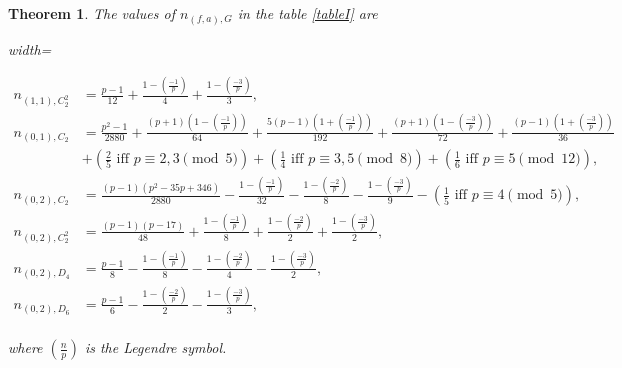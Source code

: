 \documentclass{amsart}
\numberwithin{equation}{section}
\newtheorem{theorem}{Theorem}[section]  %
\theoremstyle{definition}
\theoremstyle{remark}
\begin{document}
\begin{theorem}
The values of $n_{(f,a),G}$ in the table \ref{tableI} are\\
\begin{adjustbox}{width=\textwidth}
\begin{minipage}{1.1\textwidth}
\begin{align*}
n_{(1,1),C_2^2}&=\frac{p-1}{12}+\frac{1-\left(\frac{-1}{p}\right)}{4}+\frac{1-\left(\frac{-3}{p}\right)}{3},\\
n_{(0,1),C_2}&= \frac{p^2 - 1}{2880} 
+ \frac{(p+1)\left( 1 - \left( \frac{-1}{p} \right) \right)}{64}
+ \frac{5(p - 1)\left( 1 + \left( \frac{-1}{p} \right) \right)}{192}
+ \frac{(p + 1)\left( 1 - \left( \frac{-3}{p} \right) \right)}{72}
+ \frac{(p - 1)\left( 1 + \left( \frac{-3}{p} \right) \right)}{36}\\
&+ \left(\frac{2}{5} \text { iff } p \equiv 2, 3\pmod{5}\right)+\left(\frac{1}{4} \text { iff } p \equiv 3, 5\pmod{8}\right)+\left(\frac{1}{6} \text { iff } p \equiv 5\pmod{12}\right),\\
n_{(0,2),C_2}&=\frac{(p-1)\left(p^2-35 p+346\right)}{2880}-\frac{1-\left(\frac{-1}{p}\right)}{32}-\frac{1-\left(\frac{-2}{p}\right)}{8}-\frac{1-\left(\frac{-3}{p}\right)}{9}-\left(\frac{1}{5} \text { iff } p \equiv 4 \pmod 5\right),\\
n_{(0,2),C_2^2}&=\frac{(p-1)(p-17)}{48}+\frac{1-\left(\frac{-1}{p}\right)}{8}+\frac{1-\left(\frac{-2}{p}\right)}{2}+\frac{1-\left(\frac{-3}{p}\right)}{2},\\
n_{(0,2),D_4}&=\frac{p-1}{8}-\frac{1-\left(\frac{-1}{p}\right)}{8}-\frac{1-\left(\frac{-2}{p}\right)}{4}-\frac{1-\left(\frac{-3}{p}\right)}{2},\\
n_{(0,2),D_6}&=\frac{p-1}{6}-\frac{1-\left(\frac{-2}{p}\right)}{2}-\frac{1-\left(\frac{-3}{p}\right)}{3},\\
\end{align*}
\end{minipage}
\end{adjustbox}
where $\left(\frac{n}{p}\right)$ is the Legendre symbol.
\end{theorem}
\end{document}
